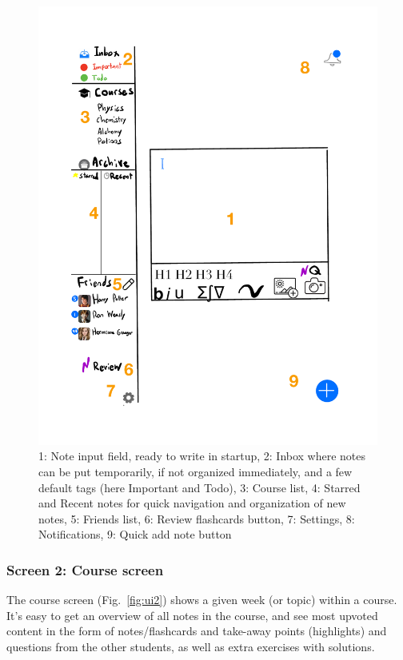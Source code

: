 \begin{figure}
\centering
\includegraphics{assets/Flashnotev2-1.pdf}
\caption{1: Note input field, ready to write in startup, 2: Inbox where
notes can be put temporarily, if not organized immediately, and a few
default tags (here Important and Todo), 3: Course list, 4: Starred and
Recent notes for quick navigation and organization of new notes, 5:
Friends list, 6: Review flashcards button, 7: Settings, 8:
Notifications, 9: Quick add note button}\label{fig:ui1}
\end{figure}

\subsubsection{Screen 2: Course screen}\label{screen-2-course-screen}

The course screen (Fig.~\ref{fig:ui2}) shows a given week (or topic)
within a course. It's easy to get an overview of all notes in the
course, and see most upvoted content in the form of notes/flashcards and
take-away points (highlights) and questions from the other students, as
well as extra exercises with solutions.

